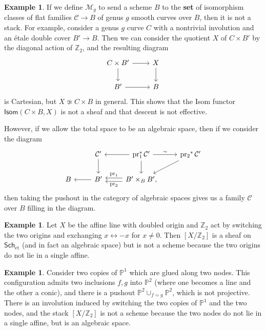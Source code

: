 \documentclass{amsart}
\theoremstyle{definition}
\newtheorem{exm}[thm]{Example}
\theoremstyle{remark}
\theoremstyle{plain}
\theoremstyle{definition}
\theoremstyle{remark}
\newcommand{\Z}{\mathbb{Z}}
\renewcommand{\P}{\mathbb{P}}
\newcommand{\mc}[1]{\mathcal{#1}}
\newcommand{\on}[1]{\operatorname{#1}}
\newcommand{\ms}[1]{\mathsf{#1}}
\newcommand{\1}{\mathbf{1}}
\newcommand{\2}{\mathbf{2}}
\newcommand{\3}{\mathbf{3}}
\begin{document}
\begin{exm}
    If we define \(\mc{M}_g\) to send a scheme \(B\) to the \textbf{set} of isomorphism classes of flat families \(\mc{C} \to B\) of genus \(g\) smooth curves over \(B\), then it is not a stack. For example, consider a genus \(g\) curve \(C\) with a nontrivial involution and an \'etale double cover \(B' \to B\). Then we can consider the quotient \(X\) of \(C \times B'\) by the diagonal action of \(\Z_2\), and the resulting diagram
    \begin{equation*}
    \begin{tikzcd}
        C \times B' \ar{r} \ar{d} & X \ar{d} \\
        B' \ar{r} & B
    \end{tikzcd}
    \end{equation*}
    is Cartesian, but \(X \not\simeq C \times B\) in general. This shows that the Isom functor \(\ms{Isom}(C \times B, X)\) is not a sheaf and that descent is not effective.

    However, if we allow the total space to be an algebraic space, then if we consider the diagram
    \begin{equation*}
    \begin{tikzcd}
        & \mc{C}' \ar{d} & \on{pr}_1^* \mc{C'} \ar{l} \ar{r}{\sim} \ar{d} & \on{pr_2}^* \mc{C}' \ar{dl} \\
        B & B' \ar{l} & B' \times_B B' \ar[shift right=1]{l}[swap]{\on{pr}_1} \ar[shift left=1]{l}{\on{pr}_2},
    \end{tikzcd}
    \end{equation*}
    then taking the pushout in the category of algebraic spaces gives us a family \(\mc{C}\) over \(B\) filling in the diagram.
\end{exm}

\begin{exm}
    Let \(X\) be the affine line with doubled origin and \(\Z_2\) act by switching the two origins and exchanging \(x \leftrightarrow -x\) for \(x \neq 0\). Then \([X/\Z_2]\) is a sheaf on \(\ms{Sch}_{\on{\acute{e}t}}\) (and in fact an algebraic space) but is not a scheme because the two origins do not lie in a single affine.
\end{exm}

\begin{exm}
    Consider two copies of \(\P^1\) which are glued along two nodes. This configuration admits two inclusions \(f,g\) into \(\P^2\) (where one becomes a line and the other a conic), and there is a pushout \(\P^2 \cup_{f = g} \P^2\), which is not projective. There is an involution induced by switching the two copies of \(\P^1\) and the two nodes, and the stack \([X / \Z_2]\) is not a scheme because the two nodes do not lie in a single affine, but is an algebraic space.
\end{exm}
\end{document}
